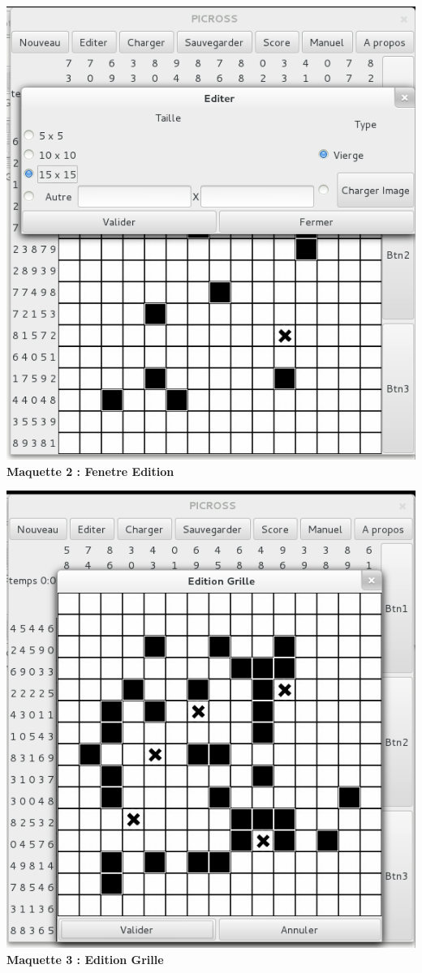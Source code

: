 \begin{center}
                \includegraphics[scale=0.6]{data/screenMaquette/FenetreEdition.png}\\
                \textbf{Maquette 2 : Fenetre Edition}
\end{center}

\begin{center}
                \includegraphics[scale=0.6]{data/screenMaquette/EditionGrille.png}\\
                \textbf{Maquette 3 : Edition Grille}
\end{center}

